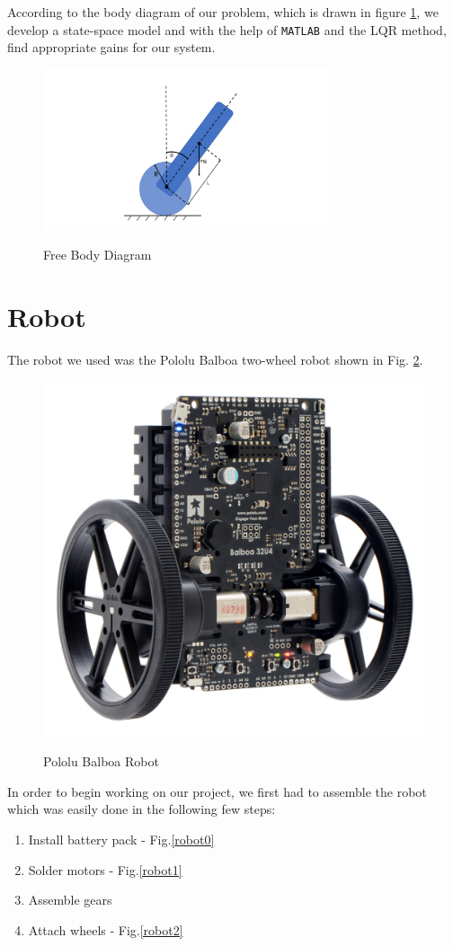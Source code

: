 \documentclass{article}
\begin{document}
According to the body diagram of our problem, which is drawn in figure \ref{fbd}, we develop a state-space model and with the help of \texttt{MATLAB} and the LQR method, find appropriate gains for our system.

\begin{figure}[H]
    \caption{Free Body Diagram}
    \centering
    \includegraphics[width=0.75\textwidth]{FBD.png}
    \label{fbd}
\end{figure}
    

\section{Robot}

The robot we used was the Pololu Balboa two-wheel robot shown in Fig. \ref{robot3}. 

\begin{figure}[H]
    \caption{Pololu Balboa Robot}
    \centering
    \includegraphics[width=0.55\linewidth]{robot3.jpg}
    \label{robot3}
\end{figure}

In order to begin working on our project, we first had to assemble the robot which was easily done in the following few steps:

\begin{enumerate}
    \item Install battery pack - Fig.\ref{robot0} 
    \item Solder motors - Fig.\ref{robot1}
    \item Assemble gears
    \item Attach wheels - Fig.\ref{robot2}
\end{enumerate}
\end{document}
